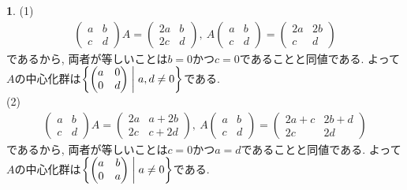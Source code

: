 \documentclass{amsart}
\theoremstyle{definition}
\newtheorem{ans}{}
\numberwithin{ans}{subsection}
\begin{document}
\begin{ans}
  (1)
  \begin{align*}
    \begin{pmatrix*}
      a & b \\
      c & d
    \end{pmatrix*} A = \begin{pmatrix*}
      2a & b \\
      2c & d
    \end{pmatrix*},\ A \begin{pmatrix*}
      a & b \\
      c & d
    \end{pmatrix*} = \begin{pmatrix*}
      2a & 2b \\
      c & d
    \end{pmatrix*}
  \end{align*}
  であるから, 両者が等しいことは$b = 0$かつ$c = 0$であることと同値である.
  よって$A$の中心化群は$\biggl\{\begin{pmatrix*}
    a & 0 \\
    0 & d \\
  \end{pmatrix*} \biggm\vert a, d \neq 0 \biggr\}$である.\\
  (2)
  \begin{align*}
    \begin{pmatrix*}
      a & b \\
      c & d
    \end{pmatrix*} A = \begin{pmatrix*}
      2a & a + 2b \\
      2c & c + 2d
    \end{pmatrix*},\ A \begin{pmatrix*}
      a & b \\
      c & d
    \end{pmatrix*} = \begin{pmatrix*}
      2a + c & 2b + d \\
      2c & 2d
    \end{pmatrix*}
  \end{align*}
  であるから, 両者が等しいことは$c = 0$かつ$a = d$であることと同値である.
  よって$A$の中心化群は$\biggl\{\begin{pmatrix*}
    a & b \\
    0 & a \\
  \end{pmatrix*} \biggm\vert a \neq 0 \biggr\}$である.
\end{ans}
\end{document}
